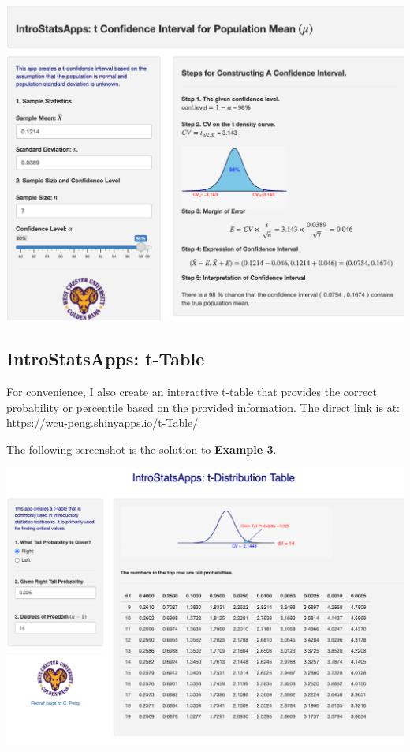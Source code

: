 \documentclass[
]{book}
\begin{document}
\begin{center}\includegraphics[width=0.9\linewidth]{week07/appsT-CI} \end{center}

\hypertarget{introstatsapps-t-table}{%
\subsection{\texorpdfstring{\textbf{IntroStatsApps}: t-Table}{IntroStatsApps: t-Table}}\label{introstatsapps-t-table}}

For convenience, I also create an interactive t-table that provides the correct probability or percentile based on the provided information. The direct link is at: \url{https://wcu-peng.shinyapps.io/t-Table/}

The following screenshot is the solution to \textbf{Example 3}.

\begin{center}\includegraphics[width=0.9\linewidth]{week07/appsT-Table} \end{center}
\end{document}
